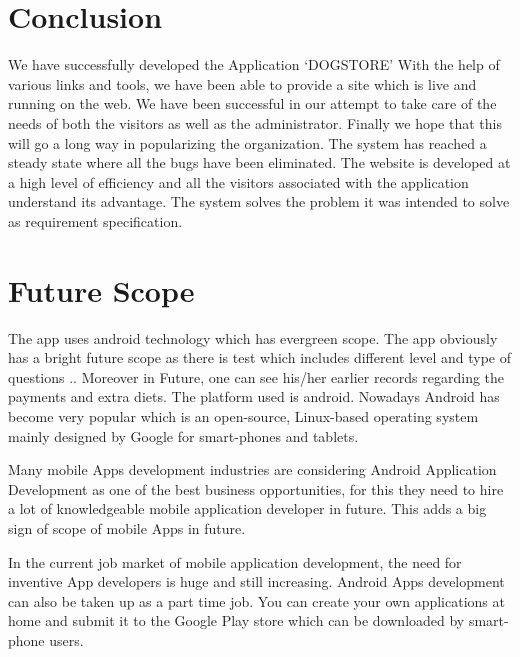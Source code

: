 \section{Conclusion}
We have successfully developed the Application ‘DOGSTORE’ With the help of various links and tools, we have been able to provide a site which is live and running on the web. We have been successful in our attempt to take care of the needs of both the visitors as well as the administrator. Finally we hope that this will go a long way in popularizing the organization. The system has reached a steady state where all the bugs have been eliminated. The website is developed at a high level of efficiency and all the visitors associated with the application understand its advantage. The system solves the problem it was intended to solve as requirement specification.

 
\section{Future Scope}
The app uses android technology which has evergreen scope. The app obviously
has a bright future scope as there is test which includes different level and type of
questions .. Moreover in Future, one can see his/her earlier records regarding the
payments and extra diets. The platform used is android. Nowadays Android has
become very popular which is an open-source, Linux-based operating system
mainly designed by Google for smart-phones and tablets.

Many mobile Apps development industries are considering Android Application
Development as one of the best business opportunities, for this they need to
hire a lot of knowledgeable mobile application developer in future. This adds a
big sign of scope of mobile Apps in future.

In the current job market of mobile application development, the need for inventive
App developers is huge and still increasing. Android Apps development can also
be taken up as a part time job. You can create your own applications at home and
submit it to the Google Play store which can be downloaded by smart-phone users.